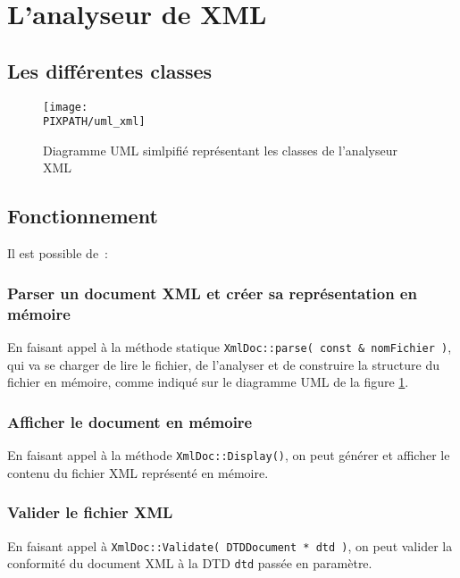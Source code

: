 \section{L'analyseur de XML}

    \subsection{Les différentes classes}
    
    \begin{center}
    \begin{figure}[h]
        \texttt{[image: \\PIXPATH/uml\_xml]}
        \caption{Diagramme UML simlpifié représentant les classes
                                                    de l'analyseur XML}
        \label{umlxml}
    \end{figure}
    \end{center}

    \subsection{Fonctionnement}

    Il est possible de~:

        \subsubsection{Parser un document XML et créer sa représentation 
                                                                en mémoire}

        En faisant appel à la méthode statique
        {\tt XmlDoc::parse( const \& nomFichier )},
        qui va se charger de lire le fichier, de l'analyser et de construire la
        structure du fichier en mémoire, comme indiqué sur le diagramme UML de
        la figure \ref{umlxml}. 

        \subsubsection{Afficher le document en mémoire}

        En faisant appel à la méthode {\tt XmlDoc::Display()}, on peut générer
        et afficher le contenu du fichier XML représenté en mémoire.

        \subsubsection{Valider le fichier XML}

        En faisant appel à {\tt XmlDoc::Validate( DTDDocument * dtd )}, on peut
        valider la conformité du document XML à la DTD {\tt dtd} passée en
        paramètre.
